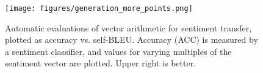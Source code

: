 \vspace{-3mm}
\begin{figure}[ht]
\centering
\hspace{-2mm}\texttt{[image: figures/generation\_more\_points.png]}
\caption{ 
Automatic evaluations of vector arithmetic for sentiment transfer, plotted as accuracy vs. self-BLEU. Accuracy (ACC) is measured by a sentiment classifier, and values for varying multiples of the sentiment vector are plotted. Upper right is better.
\label{fig:generation}
}
\end{figure}